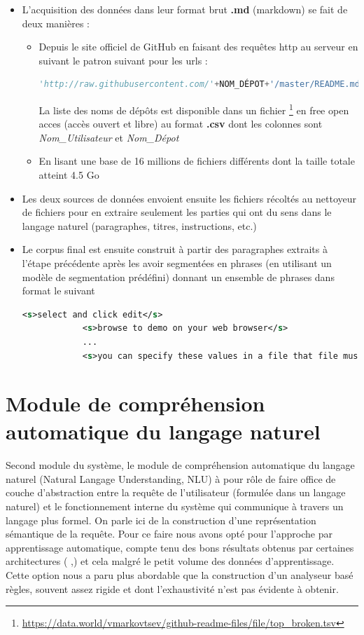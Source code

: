 		\begin{itemize}
			\item L'acquisition des données dans leur format brut \textbf{.md} (markdown) se fait de deux manières :
			\begin{itemize}
				\item Depuis le site officiel de GitHub en faisant des requêtes http au serveur en suivant le patron suivant pour les urls : 
				\begin{lstlisting}[language=python]
				'http://raw.githubusercontent.com/'+NOM_DÉPOT+'/master/README.md'\end{lstlisting}
				La liste des noms de dépôts est disponible dans un fichier \footnote{\url{https://data.world/vmarkovtsev/github-readme-files/file/top_broken.tsv}} en free open acces (accès ouvert et libre) au format \textbf{.csv} dont les colonnes sont \textit{Nom\_Utilisateur} et \textit{Nom\_Dépot} 
				\item En lisant une base de 16 millions de fichiers différents dont la taille totale atteint 4.5 Go  
			\end{itemize}
			\item Les deux sources de données envoient ensuite les fichiers récoltés au nettoyeur de fichiers pour en extraire seulement les parties qui ont du sens dans le langage naturel (paragraphes, titres, instructions, etc.)
			\item Le corpus final est ensuite construit à partir des paragraphes extraits à l'étape précédente après les avoir segmentées en phrases (en utilisant un modèle de segmentation prédéfini) donnant un ensemble de phrases dans format le suivant \begin{lstlisting}[language=xml]
			<s>select and click edit</s>
			<s>browse to demo on your web browser</s>
			...
			<s>you can specify these values in a file that file must be hom</s>\end{lstlisting}
		\end{itemize}
	

\section{Module de compréhension automatique du langage naturel}
\paragraph{}
Second module du système, le module de compréhension automatique du langage naturel (Natural Langage Understanding, NLU) à pour rôle de faire office de couche d'abstraction entre la requête de l'utilisateur (formulée dans un langage naturel) et le fonctionnement interne du système qui communique à travers un langage plus formel. On parle ici de la construction d'une représentation sémantique de la requête. Pour ce faire nous avons opté pour l'approche par apprentissage automatique, compte tenu des bons résultats obtenus par certaines architectures ( \cite{intent_slots},\cite{intent_classification}) et cela malgré le petit volume des données d'apprentissage. Cette option nous a paru plus abordable que la construction d'un analyseur basé règles, souvent assez rigide et dont l'exhaustivité n'est pas évidente à obtenir.

